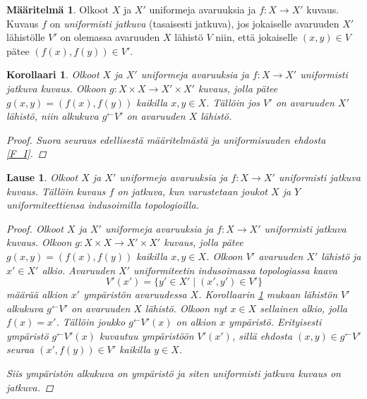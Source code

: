 \documentclass[12pt,a4paper,leqno]{report}
\theoremstyle{plain}
\newtheorem{lause}[equation]{Lause}
\newtheorem{kor}[equation]{Korollaari}
\theoremstyle{definition}
\newtheorem{maar}[equation]{Määritelmä}
\theoremstyle{remark}
\begin{document}
\begin{maar}\label{uniformisti_jatkuva}
Olkoot $X$ ja $X'$ uniformeja avaruuksia 
ja $f\colon X\rightarrow X'$ kuvaus.
Kuvaus $f$ on \emph{uniformisti jatkuva} (tasaisesti jatkuva), jos jokaiselle avaruuden $X'$ lähistölle $V'$ on olemassa avaruuden $X$ lähistö $V$ niin, että jokaiselle $(x,y)\in V$ pätee $(f(x),f(y))\in V'$. 
\end{maar}
\begin{kor}\label{uniformi alkukuva}
Olkoot $X$ ja $X'$ uniformeja avaruuksia 
ja $f\colon X\rightarrow X'$ uniformisti jatkuva kuvaus. 
Olkoon $g\colon X\times X\rightarrow X'\times X'$ %
kuvaus, jolla pätee $g(x,y)=(f(x),f(y))$ kaikilla $x,y\in X$. 
Tällöin jos $V'$ on avaruuden $X'$ lähistö, niin alkukuva $g^{\leftarrow}V'$ on avaruuden $X$ lähistö.
\begin{proof}
Suora seuraus edellisestä määritelmästä ja uniformisuuden ehdosta \ref{F_I}.
\end{proof}
\end{kor}
\begin{lause}
Olkoot $X$ ja $X'$ uniformeja avaruuksia 
ja $f\colon X\rightarrow X'$ uniformisti jatkuva kuvaus. 
Tällöin kuvaus $f$ on jatkuva, %
kun varustetaan joukot $X$ ja $Y$ uniformiteettiensa indusoimilla topologioilla.
\begin{proof}
Olkoot $X$ ja $X'$ uniformeja avaruuksia 
ja $f\colon X\rightarrow X'$ uniformisti jatkuva kuvaus. 
Olkoon $g\colon X\times X\rightarrow X'\times X'$ %
kuvaus, jolla pätee $g(x,y)=(f(x),f(y))$ kaikilla $x,y\in X$. 
Olkoon $V'$ avaruuden $X'$ lähistö ja $x'\in X'$ alkio. 
Avaruuden $X'$ uniformiteetin indusoimassa topologiassa kaava 
$$V'(x')=\{ y'\in X'\mid (x',y')\in V'\}$$
määrää alkion $x'$ ympäristön avaruudessa $X$.
Korollaarin \ref{uniformi alkukuva} mukaan lähistön $V'$ alkukuva $g^{\leftarrow}V'$ on avaruuden $X$ lähistö.
Olkoon nyt $x\in X$ sellainen alkio, jolla $f(x)=x'$.
Tällöin joukko $g^{\leftarrow}V'(x)$ on alkion $x$ ympäristö. 
Erityisesti ympäristö $g^{\leftarrow}V'(x)$ kuvautuu ympäristöön $V'(x')$, 
sillä ehdosta $(x,y)\in g^\leftarrow V'$ seuraa $(x',f(y))\in V' $ kaikilla $y\in X$.
%
%

Siis ympäristön alkukuva on ympäristö ja siten uniformisti jatkuva kuvaus on jatkuva.
\end{proof}
\end{lause}
\end{document}
